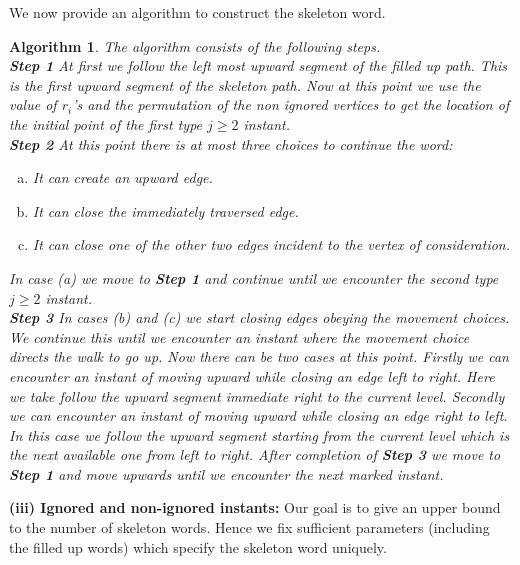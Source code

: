 \documentclass[12pt]{article}
\numberwithin{equation}{section}
\newtheorem{algorithm}{Algorithm}[section]
\numberwithin{equation}{section}
\theoremstyle{definition}
\renewcommand{\1}{\bf 1}
\begin{document}
\noindent 
We now provide an algorithm to construct the skeleton word.
\begin{algorithm}\label{Alg:skeleton2}
The algorithm consists of the following steps.
\\
\textbf{Step 1} At first we follow the left most upward segment of the filled up path. This is the first upward segment of the skeleton path. Now at this point we use the value of $r_{i}$'s and the permutation of the non ignored vertices to get the location of the initial point of the first type $j\ge 2$ instant.\\
\textbf{Step 2} At this point there is at most three choices to continue the word:
\begin{enumerate}[(a)]
\item It can create an upward edge.
\item It can close the immediately traversed edge.
\item It can close one of the other two edges incident to the vertex of consideration. 
\end{enumerate}
In case (a) we move to \textbf{Step 1} and continue until we encounter the second type $j \ge 2$ instant.\\  
\textbf{Step 3} In cases (b) and (c) we start closing edges obeying the movement choices. We continue this until we encounter an instant where the movement choice directs the walk to go up. Now there can be two cases at this point. Firstly we can encounter an instant of moving upward while closing an edge left to right. Here we take follow the upward segment immediate right to the current level. Secondly we can encounter an instant of moving upward while closing an edge right to left. In this case we follow the upward segment starting from the current level which is the next available one from left to right.  After completion of \textbf{Step 3} we move to \textbf{Step 1} and move upwards until we encounter the next marked instant.
\end{algorithm}

\noindent
\textbf{(iii) Ignored and non-ignored instants:}
\noindent
Our goal is to give an upper bound to the number of skeleton words. Hence we fix sufficient parameters (including the filled up words) which specify the skeleton word uniquely. 
\end{document}
